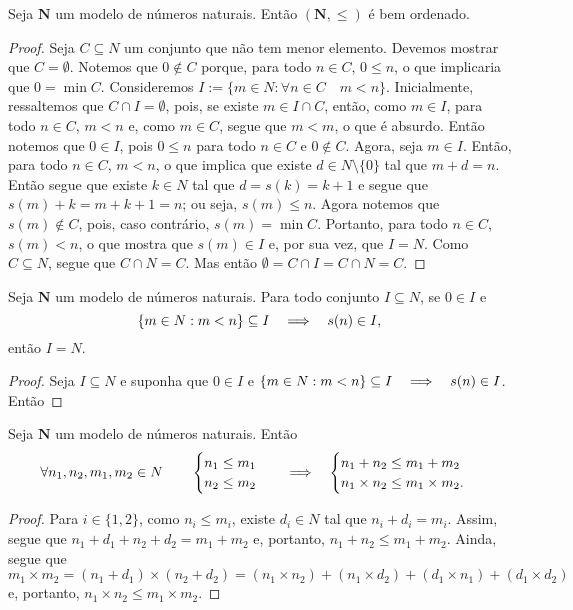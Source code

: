\begin{teo}
	Seja  $\bm N$ um modelo de números naturais. Então $(\bm N,\leq)$ é bem ordenado.
\end{teo}
\begin{proof}
	Seja $C \subseteq N$ um conjunto que não tem menor elemento. Devemos mostrar que $C=\emptyset$. Notemos que $0 \notin C$ porque, para todo $n \in C$, $0 \leq n$, o que implicaria que $0=\min C$. Consideremos $I := \{m \in N:\forall n \in C \quad m < n\}$. Inicialmente, ressaltemos que $C \cap I=\emptyset$, pois, se existe $m \in I \cap C$, então, como $m \in I$, para todo $n \in C$, $m < n$ e, como $m \in C$, segue que $m<m$, o que é absurdo. Então notemos que $0 \in I$, pois $0 \leq n$ para todo $n \in C$ e $0 \notin C$. Agora, seja $m \in I$. Então, para todo $n \in C$, $m<n$, o que implica que existe $d \in N\setminus\{0\}$ tal que $m+d=n$. Então segue que existe $k \in N$ tal que $d=s(k)=k+1$ e segue que $s(m)+k=m+k+1=n$; ou seja, $s(m) \leq n$. Agora notemos que $s(m) \notin C$, pois, caso contrário, $s(m)=\min C$. Portanto, para todo $n \in C$, $s(m)<n$, o que mostra que $s(m) \in I$ e, por sua vez, que $I=N$. Como $C \subseteq N$, segue que $C \cap N=C$. Mas então $\emptyset=C \cap I=C \cap N=C$.
\end{proof}

\begin{teo}
	Seja $\bm N$ um modelo de números naturais. Para todo conjunto $I \subseteq N$, se $0 \in I$ e
	\begin{equation*}
	\{m \in N:m<n\} \subseteq I \quad \Longrightarrow \quad s(n) \in I,
	\end{equation*}
então $I=N$.
\end{teo}
\begin{proof}
	Seja $I \subseteq N$ e suponha que $0 \in I$ e $\{m \in N:m<n\} \subseteq I \quad \Longrightarrow \quad s(n) \in I$. Então
\end{proof}


\begin{lema}
	Seja $\bm N$ um modelo de números naturais. Então
	\begin{equation*}
	\forall n_1,n_2,m_1,m_2 \in N \qquad
	\begin{cases}	
	n_1 \leq m_1 \\
	n_2 \leq m_2 
	\end{cases}
	\quad \Longrightarrow \quad 
	\begin{cases}
	n_1+n_2 \leq m_1+m_2 \\
	n_1 \times n_2 \leq m_1 \times m_2.
	\end{cases}
	\end{equation*}
\end{lema}
\begin{proof} Para $i \in\{1,2\}$, como $n_i \leq m_i$, existe $d_i \in N$ tal que $n_i+d_i=m_i$. Assim, segue que $n_1+d_1+n_2+d_2=m_1+m_2$ e, portanto, $n_1+n_2 \leq m_1+m_2$. Ainda, segue que
	\begin{equation*}
	m_1 \times m_2 = (n_1+d_1) \times (n_2+d_2) = (n_1 \times n_2) + (n_1 \times d_2) + (d_1 \times n_1) + (d_1 \times d_2)
	\end{equation*}
e, portanto, $n_1 \times n_2 \leq m_1 \times m_2$.
\end{proof}

